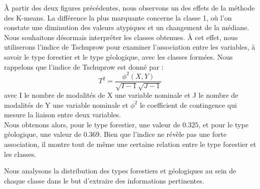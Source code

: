 \documentclass{article}
\begin{document}
À partir des deux figures précédentes, nous observons un des effets de la méthode des K-means. La différence la plus marquante concerne la classe 1, où l'on constate une diminution des valeurs atypiques et un changement de la médiane.\\
Nous souhaitons désormais interpréter les classes obtenues. À cet effet, nous utiliserons l'indice de Tschuprow pour examiner l'association entre les variables, à savoir le type forestier et le type géologique, avec les classes formées.
Nous rappelons que l'indice de Tschuprow est donné par : 
\[
T^2 = \frac{\phi^2 (X,Y)}{\sqrt{I-1}\sqrt{J-1}} 
\]
avec I le nombre de modalités de X une variable nominale et J le nombre de modalités de Y une variable nominale et $\phi^2$ le coefficient de contingence qui mesure la liaison entre deux variables. 
\\
Nous obtenons alors, pour le type forestier, une valeur de $0.325$, et pour le type géologique, une valeur de $0.369$.  
Bien que l'indice ne révèle pas une forte association, il montre tout de même une certaine relation entre le type forestier et les classes.

Nous analysons la distribution des types forestiers et géologiques au sein de chaque classe dans le but d'extraire des informations pertinentes.
\end{document}
